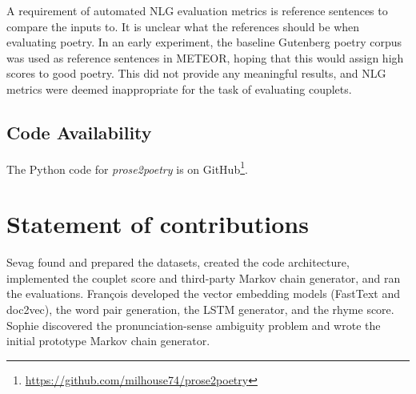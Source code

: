\documentclass[11pt,a4paper]{article}
\begin{document}
A requirement of automated NLG evaluation metrics is reference sentences to compare the inputs to. It is unclear what the references should be when evaluating poetry. In an early experiment, the baseline Gutenberg poetry corpus was used as reference sentences in METEOR, hoping that this would assign high scores to good poetry. This did not provide any meaningful results, and NLG metrics were deemed inappropriate for the task of evaluating couplets.

\subsection{Code Availability}

The Python code for \textit{prose2poetry} is on GitHub\footnote{\href{https://github.com/milhouse74/prose2poetry}{https://github.com/milhouse74/prose2poetry}}.

\section{Statement of contributions}
\label{sec:contributions}
Sevag found and prepared the datasets, created the code architecture, implemented the couplet score and third-party Markov chain generator, and ran the evaluations. François developed the vector embedding models (FastText and doc2vec), the word pair generation, the LSTM generator, and the rhyme score. Sophie discovered the pronunciation-sense ambiguity problem and wrote the initial prototype Markov chain generator.

\vfill
\clearpage %



\end{document}

